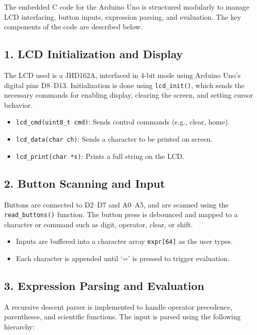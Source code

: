 \documentclass{article}
\theoremstyle{remark}
\begin{document}
The embedded C code for the Arduino Uno is structured modularly to manage LCD interfacing, button inputs, expression parsing, and evaluation. The key components of the code are described below.

\subsection{1. LCD Initialization and Display}

The LCD used is a JHD162A, interfaced in 4-bit mode using Arduino Uno's digital pins D8--D13. Initialization is done using \texttt{lcd\_init()}, which sends the necessary commands for enabling display, clearing the screen, and setting cursor behavior.

\begin{itemize}
    \item \texttt{lcd\_cmd(uint8\_t cmd)}: Sends control commands (e.g., clear, home).
    \item \texttt{lcd\_data(char ch)}: Sends a character to be printed on screen.
    \item \texttt{lcd\_print(char *s)}: Prints a full string on the LCD.
\end{itemize}

\subsection{2. Button Scanning and Input}

Buttons are connected to D2--D7 and A0--A5, and are scanned using the \texttt{read\_buttons()} function. The button press is debounced and mapped to a character or command such as digit, operator, clear, or shift.

\begin{itemize}
    \item Inputs are buffered into a character array \texttt{expr[64]} as the user types.
    \item Each character is appended until `=' is pressed to trigger evaluation.
\end{itemize}

\subsection{3. Expression Parsing and Evaluation}

A recursive descent parser is implemented to handle operator precedence, parentheses, and scientific functions. The input is parsed using the following hierarchy:
\end{document}
